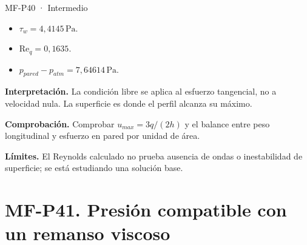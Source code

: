 \begin{studiumworked}{MF-P40 · Intermedio}
\begin{itemize}
\item $\tau_w=4{,}4145\,\mathrm{Pa}$.

\item $\mathrm{Re}_q=0{,}1635$.

\item $p_{pared}-p_{atm}=7{,}64614\,\mathrm{Pa}$.

\end{itemize}

\textbf{Interpretación.} La condición libre se aplica al esfuerzo tangencial, no a velocidad nula. La superficie es donde el perfil alcanza su máximo.

\textbf{Comprobación.} Comprobar $u_{max}=3q/(2h)$ y el balance entre peso longitudinal y esfuerzo en pared por unidad de área.

\textbf{Límites.} El Reynolds calculado no prueba ausencia de ondas o inestabilidad de superficie; se está estudiando una solución base.

\end{studiumworked}



\Needspace{.30\textheight}\section{MF-P41. Presión compatible con un remanso viscoso}

